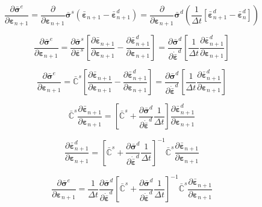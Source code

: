\documentclass[12pt]{article}
\newcommand{\pder}[2]{\dfrac{\partial #1}{\partial #2}}
\begin{document}
\begin{equation}
	\pder{\bar{\bm{\sigma}}^{e}}{\bm{\varepsilon}_{n+1}} = \pder{}{\bm{\varepsilon}_{n+1}}\bar{\bm{\sigma}}^{s}\left(\bar{\bm{\varepsilon}}_{n+1} - \bar{\bm{\varepsilon}}^{d}_{n+1}\right) = \pder{}{\bm{\varepsilon}_{n+1}}\bar{\bm{\sigma}}^{d}\left(\dfrac{1}{\Delta t}\left[\bar{\bm{\varepsilon}}^{d}_{n+1} - \bar{\bm{\varepsilon}}^{d}_{n}\right]\right) 
\end{equation}

\begin{equation}
\pder{\bar{\bm{\sigma}}^{e}}{\bm{\varepsilon}_{n+1}} = \pder{\bar{\bm{\sigma}}^{s}}{\bar{\bm{\varepsilon}}^{s}} \left[\pder{\bar{\bm{\varepsilon}}_{n+1}}{\bm{\varepsilon}_{n+1}} - \pder{\bar{\bm{\varepsilon}}^{d}_{n+1}}{\bm{\varepsilon}_{n+1}}\right] = \pder{\bar{\bm{\sigma}}^{d}}{\dot{\bar{\bm{\varepsilon}}}^{d}} \left[\dfrac{1}{\Delta t}\pder{\bar{\bm{\varepsilon}}^{d}_{n+1}}{\bm{\varepsilon}_{n+1}} \right]
\end{equation}


\begin{equation}
\pder{\bar{\bm{\sigma}}^{e}}{\bm{\varepsilon}_{n+1}} = \bar{\mathbb{C}}^{s} \left[\pder{\bar{\bm{\varepsilon}}_{n+1}}{\bm{\varepsilon}_{n+1}} - \pder{\bar{\bm{\varepsilon}}^{d}_{n+1}}{\bm{\varepsilon}_{n+1}}\right] =  \pder{\bar{\bm{\sigma}}^{d}}{\dot{\bar{\bm{\varepsilon}}}^{d}}\left[\dfrac{1}{\Delta t}\pder{\bar{\bm{\varepsilon}}^{d}_{n+1}}{\bm{\varepsilon}_{n+1}} \right]
\end{equation}

\begin{equation}
\bar{\mathbb{C}}^{s} \pder{\bar{\bm{\varepsilon}}_{n+1}}{\bm{\varepsilon}_{n+1}}  = \left[\bar{\mathbb{C}}^{s} +  \pder{\bar{\bm{\sigma}}^{d}}{\dot{\bar{\bm{\varepsilon}}}^{d}}\dfrac{1}{\Delta t}\right]\pder{\bar{\bm{\varepsilon}}^{d}_{n+1}}{\bm{\varepsilon}_{n+1}} 
\end{equation}

\begin{equation}
\pder{\bar{\bm{\varepsilon}}^{d}_{n+1}}{\bm{\varepsilon}_{n+1}}  = \left[\bar{\mathbb{C}}^{s} +  \pder{\bar{\bm{\sigma}}^{d}}{\dot{\bar{\bm{\varepsilon}}}^{d}}\dfrac{1}{\Delta t}\right]^{-1}\bar{\mathbb{C}}^{s} \pder{\bar{\bm{\varepsilon}}_{n+1}}{\bm{\varepsilon}_{n+1}}  
\end{equation}


\begin{equation}
\pder{\bar{\bm{\sigma}}^{e}}{\bm{\varepsilon}_{n+1}}  = \dfrac{1}{\Delta t} \pder{\bar{\bm{\sigma}}^{d}}{\dot{\bar{\bm{\varepsilon}}}^{d}}\left[\bar{\mathbb{C}}^{s} +  \pder{\bar{\bm{\sigma}}^{d}}{\dot{\bar{\bm{\varepsilon}}}^{d}}\dfrac{1}{\Delta t}\right]^{-1}\bar{\mathbb{C}}^{s} \pder{\bar{\bm{\varepsilon}}_{n+1}}{\bm{\varepsilon}_{n+1}}  
\end{equation}
\end{document}
